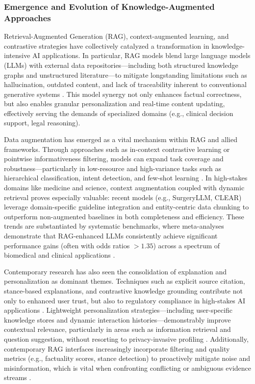 \subsubsection{Emergence and Evolution of Knowledge-Augmented Approaches}

Retrieval-Augmented Generation (RAG), context-augmented learning, and contrastive strategies have collectively catalyzed a transformation in knowledge-intensive AI applications. In particular, RAG models blend large language models (LLMs) with external data repositories—including both structured knowledge graphs and unstructured literature—to mitigate longstanding limitations such as hallucination, outdated content, and lack of traceability inherent to conventional generative systems \cite{ref4,ref14,ref15,ref28,ref36,ref54,ref61,ref62,ref63,ref64}. This model synergy not only enhances factual correctness, but also enables granular personalization and real-time content updating, effectively serving the demands of specialized domains (e.g., clinical decision support, legal reasoning).

Data augmentation has emerged as a vital mechanism within RAG and allied frameworks. Through approaches such as in-context contrastive learning or pointwise informativeness filtering, models can expand task coverage and robustness—particularly in low-resource and high-variance tasks such as hierarchical classification, intent detection, and few-shot learning \cite{ref8,ref10,ref16,ref19,ref26,ref29,ref35,ref47,ref55,ref63}. In high-stakes domains like medicine and science, context augmentation coupled with dynamic retrieval proves especially valuable: recent models (e.g., SurgeryLLM, CLEAR) leverage domain-specific guideline integration and entity-centric data chunking to outperform non-augmented baselines in both completeness and efficiency. These trends are substantiated by systematic benchmarks, where meta-analyses demonstrate that RAG-enhanced LLMs consistently achieve significant performance gains (often with odds ratios $>1.35$) across a spectrum of biomedical and clinical applications \cite{ref8}.

Contemporary research has also seen the consolidation of explanation and personalization as dominant themes. Techniques such as explicit source citation, stance-based explanations, and contrastive knowledge grounding contribute not only to enhanced user trust, but also to regulatory compliance in high-stakes AI applications \cite{ref17,ref43,ref46,ref54,ref62}. Lightweight personalization strategies—including user-specific knowledge stores and dynamic interaction histories—demonstrably improve contextual relevance, particularly in areas such as information retrieval and question suggestion, without resorting to privacy-invasive profiling \cite{ref23,ref45,ref48}. Additionally, contemporary RAG interfaces increasingly incorporate filtering and quality metrics (e.g., factuality scores, stance detection) to proactively mitigate noise and misinformation, which is vital when confronting conflicting or ambiguous evidence streams \cite{ref21,ref22,ref28,ref32,ref42,ref46,ref50,ref52}.

